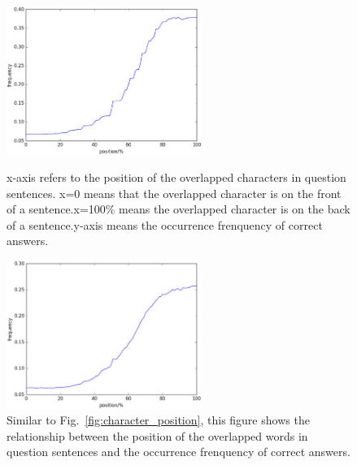 \documentclass{llncs}
\begin{document}
\begin{figure}[htb]
	\begin{minipage}[t]{0.5\linewidth} 
	\subfigure

		\includegraphics[width=2.5in]{figures/word_position.eps}
		\caption{x-axis refers to the position of the overlapped characters in question sentences. x=0 means that the overlapped character is on the front of  a sentence.x=100\% means the overlapped character is on the back of a sentence.y-axis means the occurrence frenquency of correct answers.}
		\label{fig:character_position}
	\end{minipage}
	\hspace{1ex}  
	\begin{minipage}[t]{0.5\linewidth} 
	\subfigure
	\centering
		\includegraphics[width=2.5in]{figures/character_position.eps}
		\caption{Similar to Fig.~\ref{fig:character_position}, this figure shows the relationship between the position of the overlapped words in question sentences and the occurrence frenquency of correct answers.}
		\label{fig:word_position}
	\end{minipage} 
\end{figure}
\end{document}
